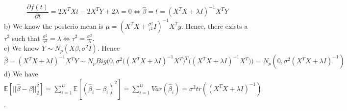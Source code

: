 \documentclass[10pt]{article}
\newenvironment{problem}[2][Problem]{\begin{trivlist}
\item[\hskip \labelsep {\bfseries #1}\hskip \labelsep {\bfseries #2.}]}{\end{trivlist}}
\begin{document}
\begin{problem}{2}
\[\frac{\partial f(t)}{\partial t} = 2X^{T}Xt - 2X^{T}Y + 2\lambda = 0 \Longleftrightarrow \hat{\beta} = t = (X^{T}X + \lambda I)^{-1}X^{T}Y\]
b) We know the posterio mean is $\mu = (X^{T}X + \frac{\sigma^2}{\tau^2} I)^{-1}X^{T}y$. Hence, there exists a $\tau^2$ such that $\frac{\sigma^2}{\tau^2} = \lambda\Longleftrightarrow \tau^2 = \frac{\sigma^2}{\lambda}$.\\
c) We know $Y \sim N_{p}(X\beta, \sigma^2 I)$. Hence
\[\hat{\beta} = (X^{T}X + \lambda I)^{-1}X^{T}Y \sim N_{p} Big (0, \sigma^2\Big ((X^{T}X + \lambda I)^{-1}X^{T} \Big )^{T}\Big ((X^{T}X + \lambda I)^{-1}X^{T} \Big ) \Big ) = N_{p}(0, \sigma^2(X^{T}X + \lambda I)^{-1}) \]
d) We have $\mathbb{E}[ ||\hat{\beta} - \beta||^2_2]=\sum_{i=1}^{D}\mathbb{E}[(\hat{\beta}_i -\beta_i)^2]=\sum_{i=1}^{D}Var(\hat{\beta}_i)=\sigma^2 tr((X^{T}X + \lambda I)^{-1})$.\\

\end{problem}
\end{document}
